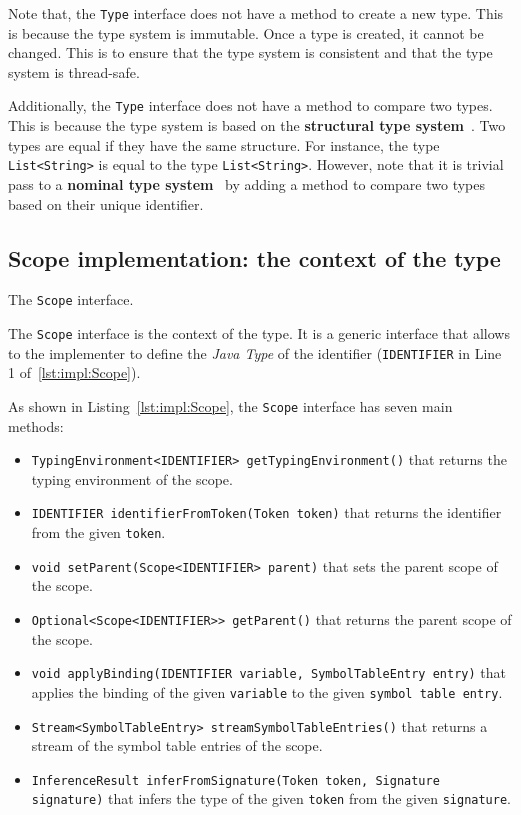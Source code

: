 Note that, the \texttt{Type} interface does not have a method to create a new type. This is because the type system is immutable. Once a type is created, it cannot be changed. This is to ensure that the type system is consistent and that the type system is thread-safe.

Additionally, the \texttt{Type} interface does not have a method to compare two types. This is because the type system is based on the \textbf{structural type system}~\cite{Cardelli88, Cook89}. Two types are equal if they have the same structure. For instance, the type \texttt{List<String>} is equal to the type \texttt{List<String>}. However, note that it is trivial pass to a \textbf{nominal type system}~\cite{Pierce02} by adding a method to compare two types based on their unique identifier.

\subsection{Scope implementation: the context of the type}\label{subsec:impl:Scope}

\begin{Listing}[tb]
    \centering
    \caption{The \texttt{Scope} interface.}
    \label{lst:impl:Scope}
\end{Listing}

The \texttt{Scope} interface is the context of the type. It is a generic interface that allows to the implementer to define the \textit{Java Type} of the identifier (\texttt{IDENTIFIER} in Line 1 of~\ref{lst:impl:Scope}).

As shown in Listing~\ref{lst:impl:Scope}, the \texttt{Scope} interface has seven main methods:

\begin{itemize}
    \item \texttt{TypingEnvironment<IDENTIFIER> getTypingEnvironment()} that returns the typing environment of the scope.
    \item \texttt{IDENTIFIER identifierFromToken(Token token)} that returns the identifier from the given \texttt{token}.
    \item \texttt{void setParent(Scope<IDENTIFIER> parent)} that sets the parent scope of the scope.
    \item \texttt{Optional<Scope<IDENTIFIER>> getParent()} that returns the parent scope of the scope.
    \item \texttt{void applyBinding(IDENTIFIER variable, SymbolTableEntry entry)} that applies the binding of the given \texttt{variable} to the given \texttt{symbol table entry}.
    \item \texttt{Stream<SymbolTableEntry> streamSymbolTableEntries()} that returns a stream of the symbol table entries of the scope.
    \item \texttt{InferenceResult inferFromSignature(Token token, Signature signature)} that infers the type of the given \texttt{token} from the given \texttt{signature}.
\end{itemize}


